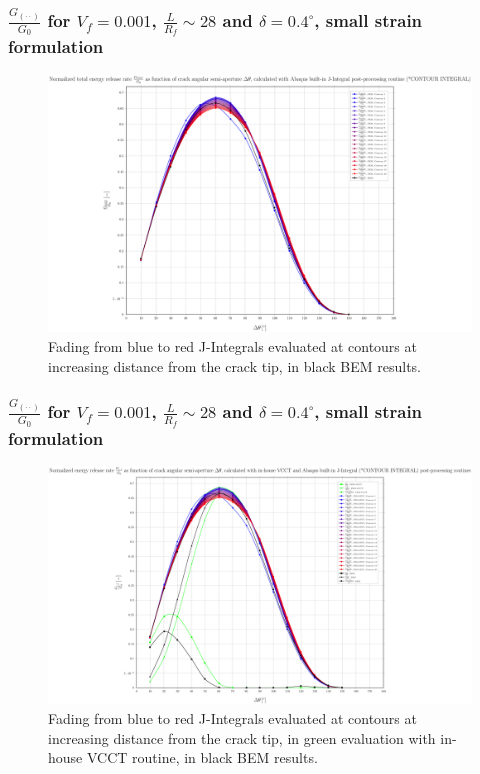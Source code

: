 \documentclass[first,firstsupp,lastsupp,handout,last,hyperref,table]{ETHclass}
\begin{document}
\begin{frame}
\frametitle{\small $\frac{G_{\left(\cdot\cdot\right)}}{G_{0}}$ for $V_{f}=0.001$, $\frac{L}{R_{f}}\sim28$ and $\delta=0.4^{\circ}$, small strain formulation}
\vspace{-0.5cm}
\centering
\captionsetup[figure]{font=scriptsize,labelfont=scriptsize}
\begin{figure}[!h]
\centering
\includegraphics[height=0.7\textheight]{2017-06-23_AbqRunSummary_SingleFiberEqRfSmallStrain_J-INT_Summary.pdf}
  \caption{\scriptsize Fading from blue to red J-Integrals evaluated at contours at increasing distance from the crack tip, in black BEM results.}
  \label{fig:res1}
\end{figure}
\end{frame}

\begin{frame}
\frametitle{\small $\frac{G_{\left(\cdot\cdot\right)}}{G_{0}}$ for $V_{f}=0.001$, $\frac{L}{R_{f}}\sim28$ and $\delta=0.4^{\circ}$, small strain formulation}
\vspace{-0.5cm}
\centering
\captionsetup[figure]{font=scriptsize,labelfont=scriptsize}
\begin{figure}[!h]
\centering
\includegraphics[height=0.7\textheight]{2017-06-23_AbqRunSummary_SingleFiberEqRfSmallStrain_VCCT-JINT_Summary.pdf}
  \caption{\scriptsize Fading from blue to red J-Integrals evaluated at contours at increasing distance from the crack tip, in green evaluation with in-house VCCT routine, in black BEM results.}
  \label{fig:res1}
\end{figure}
\end{frame}
\end{document}
